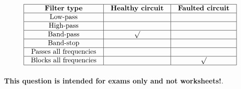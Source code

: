 $$\vbox{\offinterlineskip
\halign{\strut
\vrule \quad\hfil # \ \hfil & 
\vrule \quad\hfil # \ \hfil & 
\vrule \quad\hfil # \ \hfil \vrule \cr
\noalign{\hrule}
%
{\bf Filter type} & {\bf Healthy circuit} & {\bf Faulted circuit} \cr
%
\noalign{\hrule}
%
Low-pass &  &  \cr
%
\noalign{\hrule}
%
High-pass &  &  \cr
%
\noalign{\hrule}
%
Band-pass & $\surd$ &  \cr
%
\noalign{\hrule}
%
Band-stop &  &  \cr
%
\noalign{\hrule}
%
Passes all frequencies &  &  \cr
%
\noalign{\hrule}
%
Blocks all frequencies &  & $\surd$ \cr
%
\noalign{\hrule}
} %
}$$ %








{\bf This question is intended for exams only and not worksheets!}.




